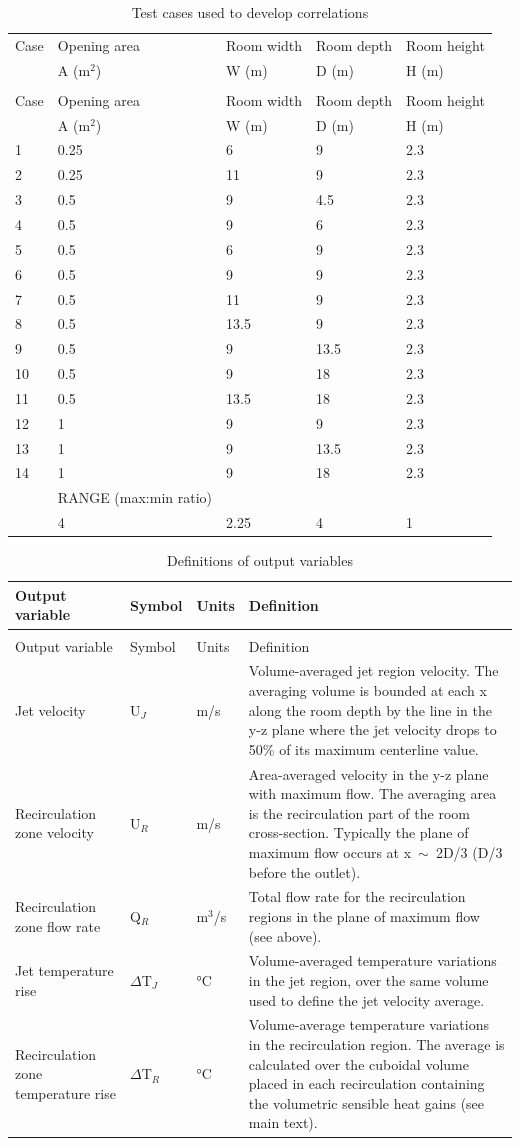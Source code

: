 \begin{longtable}[c]{@{}lllll@{}}
\caption{Test cases used to develop correlations \label{table:test-cases-used-to-develop-correlations}} \tabularnewline
\toprule
Case & Opening area & Room width & Room depth & Room height \tabularnewline
  & A (m\(^2\)) & W (m) & D (m) & H (m) \tabularnewline

\midrule
\endfirsthead

\caption[]{Test cases used to develop correlations} \tabularnewline
\toprule
Case & Opening area & Room width & Room depth & Room height \tabularnewline
  & A (m\(^2\)) & W (m) & D (m) & H (m) \tabularnewline

\midrule
\endhead

1 & 0.25 & 6 & 9 & 2.3 \tabularnewline
2 & 0.25 & 11 & 9 & 2.3 \tabularnewline
3 & 0.5 & 9 & 4.5 & 2.3 \tabularnewline
4 & 0.5 & 9 & 6 & 2.3 \tabularnewline
5 & 0.5 & 6 & 9 & 2.3 \tabularnewline
6 & 0.5 & 9 & 9 & 2.3 \tabularnewline
7 & 0.5 & 11 & 9 & 2.3 \tabularnewline
8 & 0.5 & 13.5 & 9 & 2.3 \tabularnewline
9 & 0.5 & 9 & 13.5 & 2.3 \tabularnewline
10 & 0.5 & 9 & 18 & 2.3 \tabularnewline
11 & 0.5 & 13.5 & 18 & 2.3 \tabularnewline
12 & 1 & 9 & 9 & 2.3 \tabularnewline
13 & 1 & 9 & 13.5 & 2.3 \tabularnewline
14 & 1 & 9 & 18 & 2.3 \tabularnewline
   & RANGE (max:min ratio) \tabularnewline
 & 4 & 2.25 & 4 & 1 \tabularnewline
\bottomrule
\end{longtable}

\begin{longtable}[c]{p{1.25in}p{0.5in}p{0.5in}p{3.0in}}
\caption{Definitions of output variables \label{table:definitions-of-output-variables}} \tabularnewline
\toprule
Output variable & Symbol & Units & Definition \tabularnewline
\midrule
\endfirsthead

\caption[]{Definitions of output variables} \tabularnewline
\toprule
Output variable & Symbol & Units & Definition \tabularnewline
\midrule
\endhead
Jet velocity & U\(_J\) & m/s & Volume-averaged jet region velocity. The averaging volume is bounded at each x along the room depth by the line in the y-z plane where the jet velocity drops to 50\% of its maximum centerline value. \tabularnewline
Recirculation zone velocity & U\(_R\) & m/s & Area-averaged velocity in the y-z plane with maximum flow. The averaging area is the recirculation part of the room cross-section. Typically the plane of maximum flow occurs at x~\(\sim\)~2D/3 (D/3 before the outlet). \tabularnewline
Recirculation zone flow rate & Q\(_R\) & m\(^3\)/s & Total flow rate for the recirculation regions in the plane of maximum flow (see above). \tabularnewline
Jet temperature rise & $\Delta$T\(_J\) & °C & Volume-averaged temperature variations in the jet region, over the same volume used to define the jet velocity average. \tabularnewline
Recirculation zone temperature rise & $\Delta$T\(_R\) & °C & Volume-average temperature variations in the recirculation region. The average is calculated over the cuboidal volume placed in each recirculation containing the volumetric sensible heat gains (see main text). \tabularnewline
\bottomrule
\end{longtable}

